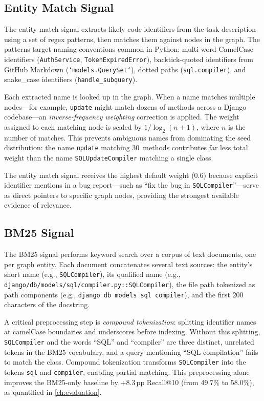 \subsection{Entity Match Signal}
\label{sec:entity-match}

The entity match signal extracts likely code identifiers from the task description using a set of regex patterns, then matches them against nodes in the graph. The patterns target naming conventions common in Python: multi-word CamelCase identifiers (\texttt{AuthService}, \texttt{TokenExpiredError}), backtick-quoted identifiers from GitHub Markdown (\texttt{`models.QuerySet`}), dotted paths (\texttt{sql.compiler}), and snake\_case identifiers (\texttt{handle\_subquery}).

Each extracted name is looked up in the graph. When a name matches multiple nodes---for example, \texttt{update} might match dozens of methods across a Django codebase---an \emph{inverse-frequency weighting} correction is applied. The weight assigned to each matching node is scaled by $1 / \log_2(n + 1)$, where $n$ is the number of matches. This prevents ambiguous names from dominating the seed distribution: the name \texttt{update} matching 30~methods contributes far less total weight than the name \texttt{SQLUpdateCompiler} matching a single class.

The entity match signal receives the highest default weight (0.6) because explicit identifier mentions in a bug report---such as ``fix the bug in \texttt{SQLCompiler}''---serve as direct pointers to specific graph nodes, providing the strongest available evidence of relevance.


\subsection{BM25 Signal}
\label{sec:bm25-signal}

The BM25 signal performs keyword search over a corpus of text documents, one per graph entity. Each document concatenates several text sources: the entity's short name (e.g., \texttt{SQLCompiler}), its qualified name (e.g., \texttt{django/db/models/sql/compiler.py::SQLCompiler}), the file path tokenized as path components (e.g., \texttt{django db models sql compiler}), and the first 200 characters of the docstring.

A critical preprocessing step is \emph{compound tokenization}: splitting identifier names at camelCase boundaries and underscores before indexing. Without this splitting, \texttt{SQLCompiler} and the words ``SQL'' and ``compiler'' are three distinct, unrelated tokens in the BM25 vocabulary, and a query mentioning ``SQL compilation'' fails to match the class. Compound tokenization transforms \texttt{SQLCompiler} into the tokens \texttt{sql} and \texttt{compiler}, enabling partial matching. This preprocessing alone improves the BM25-only baseline by +8.3\,pp Recall@10 (from 49.7\% to 58.0\%), as quantified in \cref{ch:evaluation}.


